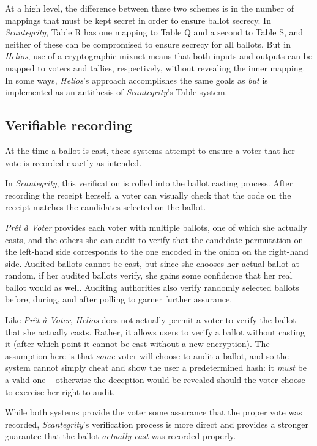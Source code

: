 \documentclass[10pt,twocolumn]{article}
\newcommand{\term}[1]{\textit{#1}}
\newcommand{\preta}{Pr\^{e}t \`{a}}
\newcommand{\pv}{\preta{} Voter}
\begin{document}
At a high level, the difference between these two schemes is in the number of mappings that must be
kept secret in order to ensure ballot secrecy. In \term{Scantegrity}, Table R has one mapping to Table Q
and a second to Table S, and neither of these can be compromised to ensure secrecy for all ballots.
But in \term{Helios}, use of a cryptographic mixnet means that both inputs and outputs can be mapped to
voters and tallies, respectively, without revealing the inner mapping. In some ways, \term{Helios}'s
approach accomplishes the same goals as \emph{but} is implemented as an antithesis of \term{Scantegrity}'s
Table system.

\subsection{Verifiable recording}

At the time a ballot is cast, these systems attempt to ensure a voter that her
vote is recorded exactly as intended.

In \term{Scantegrity}, this verification is rolled into the ballot casting process. After recording the
receipt herself, a voter can visually check that the code on the receipt matches the candidates
selected on the ballot.

\term{\pv{}} provides each voter with multiple ballots, one of which she actually casts, and the others
she can audit to verify that the candidate permutation on the left-hand side corresponds to the one
encoded in the onion on the right-hand side. Audited ballots cannot be cast, but since she chooses
her actual ballot at random, if her audited ballots verify, she gains some confidence that
her real ballot would as well. Auditing authorities also verify randomly selected ballots before,
during, and after polling to garner further assurance.

Like \term{\pv{}}, \term{Helios} does not actually permit a voter to verify the ballot that she actually casts. Rather, it
allows users to verify a ballot without casting it (after which point it cannot be cast without
a new encryption). The assumption here is that \emph{some} voter will choose to audit a ballot, and
so the system cannot simply cheat and show the user a predetermined hash: it \emph{must} be a valid
one -- otherwise the deception would be revealed should the voter choose to exercise her right
to audit.

While both systems provide the voter some assurance that the proper vote was recorded, \term{Scantegrity}'s
verification process is more direct and provides a stronger guarantee that the ballot \emph{actually
cast} was recorded properly.
\end{document}
